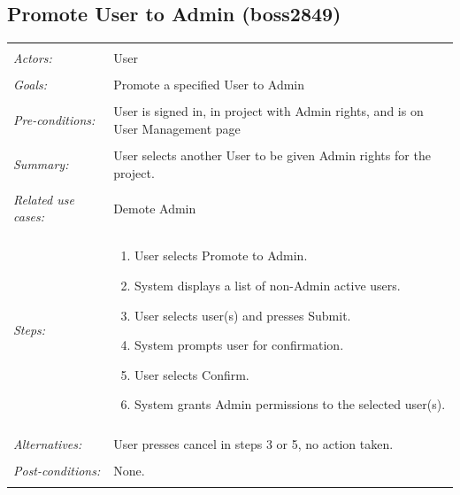 \documentclass[11pt]{report}
\begin{document}
\subsection{Promote User to Admin  (boss2849)}
\begin{tabular}{ p{2cm} p{12cm} }
 \hline
 \\
 \textit{Actors:} & User \\ 
 \\
 \textit{Goals:} & Promote a specified User to Admin \\
 \\
 \textit{Pre-conditions:} & User is signed in, in project with Admin rights, and is on User Management page \\
 \\
 \textit{Summary:} & User selects another User to be given Admin rights for the project. \\ 
 \\
 \textit{Related use cases:} & Demote Admin \\ 
 \\
 \textit{Steps:} & \begin{enumerate}
  \item User selects Promote to Admin.
  \item System displays a list of non-Admin active users.
  \item User selects user(s) and presses Submit.
  \item System prompts user for confirmation.
  \item User selects Confirm.
  \item System grants Admin permissions to the selected user(s).
 \end{enumerate} \\
 \\
 \textit{Alternatives:} & User presses cancel in steps 3 or 5, no action taken. \\
 \\
 \textit{Post-conditions:} & None. \\
 \\
\hline
\end{tabular}
\end{document}
